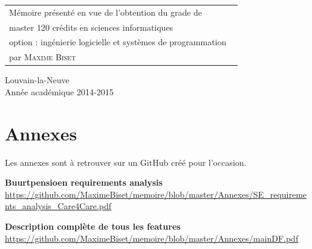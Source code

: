 \documentclass[british]{article}
\renewcommand\title{Analyse et développement d'un framework open source d'online banking pour des organisations d'échange social en monnaies complémentaires}
\newcommand\name{\textsc{Maxime Biset}}
\newcommand\years{2014-2015}
\begin{document}
\begin{minipage}{.5\textwidth}
\begin{tabular}{l}
Mémoire présenté en vue de l'obtention du grade de
\\ master 120 crédits en sciences informatiques
\\ option : ingénierie logicielle et systèmes de programmation \
\\ par \name \
\end{tabular}
\end{minipage}
\vfill
\begin{center}
Louvain-la-Neuve
\\ Année académique \years
\end{center}





\newpage



\newpage
\tableofcontents
\newpage
{}



















\newpage

\nocite{*}


\appendix

\section{Annexes}
Les annexes sont à retrouver sur un GitHub créé pour l'occasion.

\textbf{Buurtpensioen requirements analysis}\\
\label{bpse}
\url{https://github.com/MaximeBiset/memoire/blob/master/Annexes/SE_requirements_analysis_Care4Care.pdf}

\textbf{Description complète de tous les features}\\
\label{featureDescr}
\url{https://github.com/MaximeBiset/memoire/blob/master/Annexes/mainDF.pdf}
\end{document}
